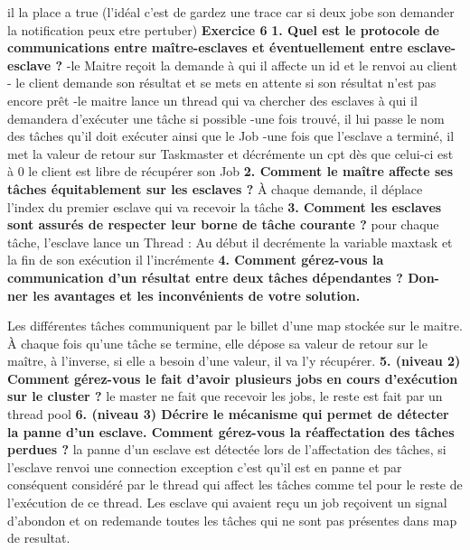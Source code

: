 \documentclass{article}
\begin{document}
il la place a true (l'idéal c'est de gardez une trace car si deux jobe son demander la notification peux etre pertuber)
\newline
\newline
\textbf{Exercice 6}
\newline
\textbf{1. Quel est le protocole de communications entre maître-esclaves et éventuellement entre
esclave-esclave ?}
-le Maitre reçoit la demande à qui il affecte un id et le renvoi au client 
- le client demande son résultat et se mets en attente si son résultat n'est pas encore prêt 
-le maitre lance un thread qui va chercher  des esclaves à qui il demandera d'exécuter une tâche si possible 
-une fois trouvé, il lui passe le nom des tâches qu'il doit exécuter ainsi que le Job
-une fois que l'esclave a terminé, il met la valeur de retour sur Taskmaster et décrémente un cpt dès que celui-ci est à 0 le client est libre de récupérer son Job
\newline
\newline
\textbf{2. Comment le maître affecte ses tâches équitablement sur les esclaves ?}
\newline
À chaque demande, il déplace l'index du premier esclave qui va recevoir la tâche 
\newline
\textbf{3. Comment les esclaves sont assurés de respecter leur borne de tâche courante ?}
\newline
pour chaque tâche, l'esclave lance un Thread : Au début il decrémente la variable maxtask et la fin de son exécution il l'incrémente
\newline
\textbf{4. Comment gérez-vous la communication d’un résultat entre deux tâches dépendantes ? Don-
ner les avantages et les inconvénients de votre solution.}
\newline

Les différentes tâches communiquent par le billet d'une map stockée sur le maitre. 
À chaque fois qu'une tâche se termine, elle dépose sa valeur de retour sur le maître, à l'inverse, si elle a besoin d'une valeur, il va l'y récupérer. 
\newline
\textbf{5. (niveau 2) Comment gérez-vous le fait d’avoir plusieurs jobs en cours d’exécution sur le
cluster ?}
\newline
le master ne fait que recevoir les jobs, le reste est fait par un thread pool
\newline
\textbf{6. (niveau 3) Décrire le mécanisme qui permet de détecter la panne d’un esclave. Comment
gérez-vous la réaffectation des tâches perdues ?}
\newline
la panne d'un esclave est détectée lors de l'affectation des tâches, si l'esclave renvoi une connection exception c'est qu'il est en panne 
et par conséquent considéré par le thread qui affect les tâches comme tel pour le reste de l'exécution de ce thread.
Les esclave qui avaient reçu un job reçoivent un signal d'abondon et on redemande toutes les tâches qui ne sont pas présentes dans map de resultat.
\end{document}
